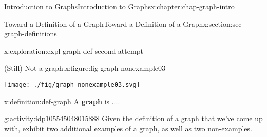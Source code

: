 \documentclass[oneside,10pt,]{book}
\newcommand{\terminology}[1]{\textbf{#1}}
\begin{document}
\begin{chapterptx}{Introduction to Graphs}{}{Introduction to Graphs}{}{}{x:chapter:chap-graph-intro}
\begin{sectionptx}{Toward a Definition of a Graph}{}{Toward a Definition of a Graph}{}{}{x:section:sec-graph-definitions}
\begin{exploration}{}{x:exploration:expl-graph-def-second-attempt}
\begin{figureptx}{(Still) Not a graph.}{x:figure:fig-graph-nonexample03}{}
\begin{image}{0.375}{0.25}{0.375}%
\texttt{[image: ./fig/graph-nonexample03.svg]}
\end{image}%
\tcblower
\end{figureptx}%
\end{exploration}%
\begin{definition}{}{x:definition:def-graph}%
%
A \terminology{graph} is ....%
\end{definition}
\begin{activity}{}{g:activity:idp105545048015888}%
Given the definition of a graph that we've come up with, exhibit two additional examples of a graph, as well as two non-examples.%
\end{activity}%
\end{sectionptx}
\end{chapterptx}
%
%
\typeout{************************************************}
\typeout{************************************************}
%
\end{document}
